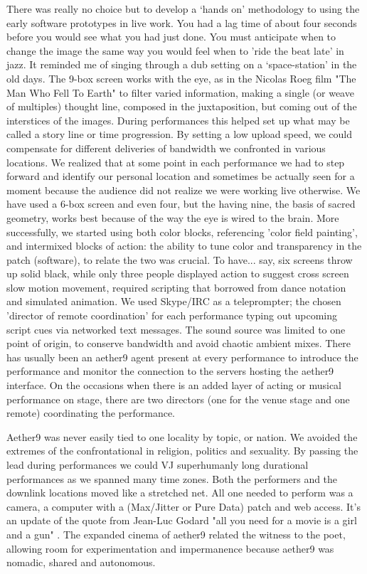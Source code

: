 There was really no choice but to develop a ‘hands on’ methodology to using the early software prototypes in live work. You had a lag time of about four seconds before you would see what you had just done. You must anticipate when to change the image the same way you would feel when to 'ride the beat late' in jazz. It reminded me of singing through a dub setting on a ‘space-station’ in the old days. The 9-box screen works with the eye, as in the Nicolas Roeg film "The Man Who Fell To Earth" to filter varied information, making a single (or weave of multiples) thought line, composed in the juxtaposition, but coming out of the interstices of the images. During performances this helped set up what may be called a story line or time progression. By setting a low upload speed, we could compensate for different deliveries of bandwidth we confronted in various locations. We realized that at some point in each performance we had to step forward and identify our personal location and sometimes be actually seen for a moment because the audience did not realize we were working live otherwise. We have used a 6-box screen and even four, but the having nine, the basis of sacred geometry, works best because of the way the eye is wired to the brain. More successfully, we started using both color blocks, referencing 'color field painting', and intermixed blocks of action: the ability to tune color and transparency in the patch (software), to relate the two was crucial. To have... say, six screens throw up solid black, while only three people displayed action to suggest cross screen slow motion movement, required scripting that borrowed from dance notation and simulated animation. We used Skype/IRC as a teleprompter; the chosen 'director of remote coordination' for each performance typing out upcoming script cues via networked text messages. The sound source was limited to one point of origin, to conserve bandwidth and avoid chaotic ambient mixes. There has usually been an aether9 agent present at every performance to introduce the performance and monitor the connection to the servers hosting the aether9 interface. On the occasions when there is an added layer of acting or musical performance on stage, there are two directors (one for the venue stage and one remote) coordinating the performance.
 
Aether9 was never easily tied to one locality by topic, or nation. We avoided the extremes of the confrontational in religion, politics and sexuality.  By passing the lead during performances we could VJ superhumanly long durational performances as we spanned many time zones. Both the performers and the downlink locations moved like a stretched net. All one needed to perform was a camera, a computer with a (Max/Jitter or Pure Data) patch and web access. It’s an update of the quote from Jean-Luc Godard "all you need for a movie is a girl and a gun" . The expanded cinema of aether9 related the witness to the poet, allowing room for experimentation and impermanence because aether9 was nomadic, shared and autonomous. 
 
